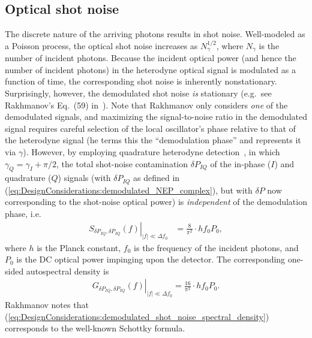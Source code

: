 \subsection{Optical shot noise}
\label{sec:DesignConsiderations:amplitude_noise:shot}
The discrete nature of the arriving photons results in shot noise.
Well-modeled as a Poisson process,
the optical shot noise increases as $N_{\gamma}^{1/2}$, where
$N_{\gamma}$ is the number of incident photons.
Because the incident optical power (and hence the number of incident photons)
in the heterodyne optical signal is modulated as a function of time,
the corresponding shot noise is inherently nonstationary.
Surprisingly, however, the demodulated shot noise \emph{is} stationary
(e.g.\ see Rakhmanov's Eq.~(59) in~\cite{rakhmanov_ao01}).
Note that Rakhmanov only considers \emph{one} of the demodulated signals, and
maximizing the signal-to-noise ratio in the demodulated signal
requires careful selection of the local oscillator's phase
relative to that of the heterodyne signal
(he terms this the ``demodulation phase'' and
represents it via $\gamma$).
However, by employing quadrature heterodyne detection~\cite{carlstrom_rsi88},
in which $\gamma_Q = \gamma_I + \pi / 2$,
the total shot-noise contamination $\delta P_{IQ}$
of the in-phase ($I$) and quadrature ($Q$) signals
(with $\delta P_{IQ}$ as defined in
(\ref{eq:DesignConsiderations:demodulated_NEP_complex}),
but with $\delta P$ now corresponding to the shot-noise optical power)
is \emph{independent} of the demodulation phase, i.e.\
\begin{align}
  \left.
    S_{\delta P_{IQ}, \delta P_{IQ}}(f)
  \right|_{|f| \ll \Delta f_0}
  &=
  \frac{8}{\pi^2}
  \cdot
  h f_0 P_0,
\end{align}
where
$h$ is the Planck constant,
$f_0$ is the frequency of the incident photons, and
$P_0$ is the DC optical power impinging upon the detector.
The corresponding one-sided autospectral density is
\begin{align}
  \left.
    G_{\delta P_{IQ}, \delta P_{IQ}}(f)
  \right|_{|f| \ll \Delta f_0}
  =
  \frac{16}{\pi^2}
  \cdot
  h f_0 P_0.
  \label{eq:DesignConsiderations:demodulated_shot_noise_spectral_density}
\end{align}
Rakhmanov notes that
(\ref{eq:DesignConsiderations:demodulated_shot_noise_spectral_density})
corresponds to the well-known Schottky formula.

